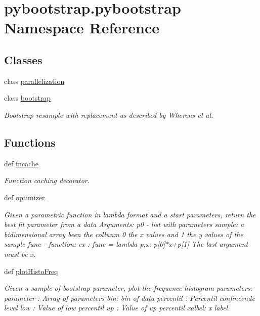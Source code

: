 \hypertarget{namespacepybootstrap_1_1pybootstrap}{\section{pybootstrap.\-pybootstrap Namespace Reference}
\label{namespacepybootstrap_1_1pybootstrap}
}
\subsection*{Classes}
\begin{DoxyCompactItemize}
\item 
class \hyperlink{classpybootstrap_1_1pybootstrap_1_1parallelization}{parallelization}
\item 
class \hyperlink{classpybootstrap_1_1pybootstrap_1_1bootstrap}{bootstrap}
\begin{DoxyCompactList}\small\item\em Bootstrap resample with replacement as described by Wherens et al. \end{DoxyCompactList}\end{DoxyCompactItemize}
\subsection*{Functions}
\begin{DoxyCompactItemize}
\item 
def \hyperlink{namespacepybootstrap_1_1pybootstrap_a2408bf80ba0025923f6e077fc32e99fc}{fncache}
\begin{DoxyCompactList}\small\item\em Function caching decorator. \end{DoxyCompactList}\item 
def \hyperlink{namespacepybootstrap_1_1pybootstrap_ab6c6e8f03a39ef6222322d6252f2124d}{optimizer}
\begin{DoxyCompactList}\small\item\em Given a parametric function in lambda format and a start parameters, return the best fit parameter from a data Arguments\-: p0 -\/ list with parameters sample\-: a bidimensional array been the collunm 0 the x values and 1 the y values of the sample func -\/ function\-: ex \-: func = lambda p,x\-: p\mbox{[}0\mbox{]}$\ast$x+p\mbox{[}1\mbox{]} The last argument must be x. \end{DoxyCompactList}\item 
def \hyperlink{namespacepybootstrap_1_1pybootstrap_ac300a1ef9c231e5e984854a67db180ca}{plot\-Histo\-Freq}
\begin{DoxyCompactList}\small\item\em Given a sample of bootstrap parameter, plot the frequence histogram parameters\-: parameter \-: Array of parameters bin\-: bin of data percentil \-: Percentil confincende level low \-: Value of low percentil up \-: Value of up percentil xalbel\-: x label. \end{DoxyCompactList}\end{DoxyCompactItemize}
